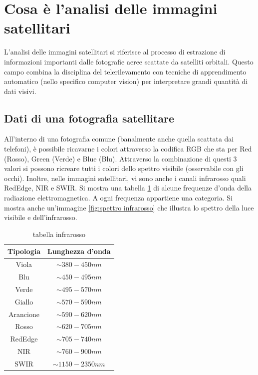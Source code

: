 \newpage
\section{Cosa è l'analisi delle immagini satellitari}
L'analisi delle immagini satellitari si riferisce al processo di estrazione di informazioni importanti dalle fotografie aeree scattate da satelliti orbitali.
Questo campo combina la disciplina del telerilevamento con tecniche di apprendimento automatico (nello specifico computer vision) per interpretare grandi quantità di dati visivi.
\subsection{Dati di una fotografia satellitare}
All'interno di una fotografia comune (banalmente anche quella scattata dai telefoni), è possibile ricavarne i colori attraverso la codifica RGB che sta per Red (Rosso), 
Green (Verde) e Blue (Blu). Attraverso la combinazione di questi 3 valori si possono ricreare tutti i colori dello spettro 
visibile (osservabile con gli occhi). Inoltre, nelle immagini satellitari, vi sono anche i canali infrarosso quali 
RedEdge, NIR e SWIR.
Si mostra una tabella \ref{tab:tabella infrarosso} di alcune frequenze d'onda della radiazione 
elettromagnetica. A ogni frequenza appartiene una categoria. Si mostra anche un'immagine \ref{fig:spettro infrarosso} che illustra lo spettro della luce visibile e dell'infrarosso.
\begin{table}[htbp]
    
    \begin{center}
    \begin{tabular}{|c|c|}
    \hline
    Tipologia & Lunghezza d'onda \\
    \hline
    Viola & $\sim 380-450 nm$ \\
    Blu & $\sim 450-495 nm$ \\
    Verde & $\sim 495-570 nm$ \\ 
    Giallo & $\sim 570-590 nm$ \\
    Arancione & $\sim 590-620 nm$ \\
    Rosso & $\sim 620-705 nm$ \\
    RedEdge & $\sim 705-740 nm$ \\
    NIR & $\sim 760-900 nm$ \\
    SWIR & $\sim 1150-2350 nm$ \\

    \hline
    \end{tabular}
    \caption{tabella infrarosso}
    \label{tab:tabella infrarosso}
    \end{center}
\end{table}

